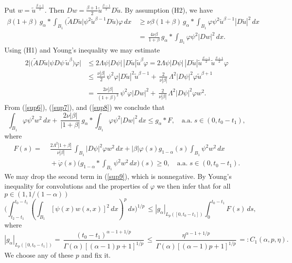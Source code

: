 \documentclass[10pt]{article}
\begin{document}
Put $w=\tilde{u}^{\frac{\beta+1}{2}}$. Then $Dw=\frac{\beta+1}{2}
\tilde{u}^{\frac{\beta-1}{2}} D\tilde{u}$. By assumption (H2), we
have
\begin{align}
\beta(1+\beta)\,g_\alpha\ast\int_{B_1}\big(\tilde{A}D\tilde{u}|\psi^2
\tilde{u}^{\beta-1}D \tilde{u}\big)\varphi\,dx & \,\ge \nu
\beta(1+\beta)\,g_\alpha\ast\int_{B_1} \varphi
\psi^2\tilde{u}^{\beta-1}|D\tilde{u}|^2\,dx \nonumber\\
& \, = \,\frac{4\nu \beta}{1+\beta}\,g_\alpha\ast\int_{B_1}\varphi
\psi^2|Dw|^2\,dx. \label{sup7}
\end{align}
Using (H1) and Young's inequality we may estimate
\begin{align}
2\big|\big(\tilde{A}D\tilde{u}|\psi D\psi
\,\tilde{u}^{\beta}\big)\varphi\big| & \le 2\Lambda\psi|D\psi|\,|D
\tilde{u}|\tilde{u}^\beta \varphi=2\Lambda\psi|D\psi|\,|D
\tilde{u}|\tilde{u}^{\frac{\beta-1}{2}}\tilde{u}^{\frac{\beta+1}{2}}\varphi\nonumber\\
& \le \,\frac{\nu |\beta|}{2}\, \psi^2\varphi |D \tilde{u}|^2
\tilde{u}^{\beta-1}+\,\frac{2}{\nu |\beta|}\,\Lambda^2
|D\psi|^2\varphi \tilde{u}^{\beta+1}\nonumber\\
& = \,\frac{2\nu |\beta|}{(1+\beta)^2}\,
\psi^2\varphi|Dw|^2+\,\frac{2}{\nu |\beta|}\,\Lambda^2
|D\psi|^2\varphi w^2. \label{sup8}
\end{align}
From (\ref{sup6}), (\ref{sup7}), and (\ref{sup8}) we conclude that
\begin{equation} \label{sup9}
\int_{B_1}\varphi\psi^2w^2\,dx+\,\frac{2\nu
|\beta|}{|1+\beta|}\,g_\alpha\ast\int_{B_1}\varphi \psi^2|Dw|^2\,dx
\le g_\alpha\ast F,\quad\mbox{a.a.}\;s\in(0,t_0-t_1),
\end{equation}
where
\begin{align*}
F(s) =\, & \,\frac{2\Lambda^2|1+\beta|}{\nu |\beta|}\, \int_{B_1}
|D\psi|^2\varphi w^2\,dx
+|\beta|\varphi(s)g_{1-\alpha}(s)\int_{B_1}\psi^2 w^2
\,dx \\
& \,+\dot{\varphi}(s) \big(g_{1-\alpha}\ast \int_{B_1}\psi^2
w^2\,dx\big)(s)\ge 0,\quad\mbox{a.a.}\;s\in(0,t_0-t_1).
\end{align*}
We may drop the second term in (\ref{sup9}), which is nonnegative.
By Young's inequality for convolutions and the properties of
$\varphi$ we then infer that for all $p\in(1,1/(1-\alpha))$
\begin{equation} \label{sup10}
\Big(\int_{t_2-t_1}^{t_0-t_1} (\int_{B_1}
[\psi(x)w(s,x)]^2\,dx)^p\,ds\Big)^{1/p} \,\le
|g_\alpha|_{L_p([0,t_0-t_1])} \int_0^{t_0-t_1} \!\!\!\!F(s)\,ds,
\end{equation}
where
\begin{equation} \label{sup11}
|g_\alpha|_{L_p([0,t_0-t_1])}=
\,\frac{(t_0-t_1)^{\alpha-1+1/p}}{\Gamma(\alpha)[(\alpha-1)p+1]^{1/p}}\,\le
\,\frac{\eta^{\alpha-1+1/p}}{\Gamma(\alpha)[(\alpha-1)p+1]^{1/p}}\,
=:C_1(\alpha,p,\eta).
\end{equation}
We choose any of these $p$ and fix it.
\end{document}
